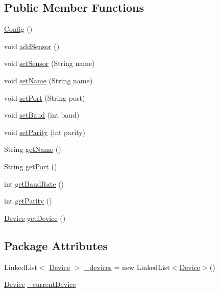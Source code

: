 \subsection*{Public Member Functions}
\begin{DoxyCompactItemize}
\item 
\hyperlink{classrob_o_s2_1_1serial_1_1_config_a80dbd2228453f877f4f5b6ca01280a77}{Config} ()
\item 
void \hyperlink{classrob_o_s2_1_1serial_1_1_config_a36382168c14ad963ea4ea4ebd9ffaf83}{addSensor} ()
\item 
void \hyperlink{classrob_o_s2_1_1serial_1_1_config_a99a7d794a237a4d1cc6cae19e3ffaa7b}{setSensor} (String name)
\item 
void \hyperlink{classrob_o_s2_1_1serial_1_1_config_a1517f09a1d0b9e3250bcfb87a288bf1d}{setName} (String name)
\item 
void \hyperlink{classrob_o_s2_1_1serial_1_1_config_a70c08cb258889e022df827e7533010e5}{setPort} (String port)
\item 
void \hyperlink{classrob_o_s2_1_1serial_1_1_config_accf154afe9e20a80b3117062e1583d9a}{setBaud} (int baud)
\item 
void \hyperlink{classrob_o_s2_1_1serial_1_1_config_a4fc55b5b2dc93aca2204434972343fde}{setParity} (int parity)
\item 
String \hyperlink{classrob_o_s2_1_1serial_1_1_config_a671c77f48aef2048043ff941fd125c07}{getName} ()
\item 
String \hyperlink{classrob_o_s2_1_1serial_1_1_config_a59ca1e514947e8548832249f1794ffc7}{getPort} ()
\item 
int \hyperlink{classrob_o_s2_1_1serial_1_1_config_a97179a6af377270a46ba76b210cef453}{getBaudRate} ()
\item 
int \hyperlink{classrob_o_s2_1_1serial_1_1_config_a2f996644f21d7d1cd9e61de83c69ecd1}{getParity} ()
\item 
\hyperlink{classrob_o_s2_1_1serial_1_1_device}{Device} \hyperlink{classrob_o_s2_1_1serial_1_1_config_a665b43dd80b1b7cdbd7ba1cb7ab7b7f6}{getDevice} ()
\end{DoxyCompactItemize}
\subsection*{Package Attributes}
\begin{DoxyCompactItemize}
\item 
LinkedList$<$ \hyperlink{classrob_o_s2_1_1serial_1_1_device}{Device} $>$ \hyperlink{classrob_o_s2_1_1serial_1_1_config_afafb54da39f788da9548e1bc957a44b6}{\_\-devices} = new LinkedList$<$\hyperlink{classrob_o_s2_1_1serial_1_1_device}{Device}$>$()
\item 
\hyperlink{classrob_o_s2_1_1serial_1_1_device}{Device} \hyperlink{classrob_o_s2_1_1serial_1_1_config_a9973bd83d16badea8a822f7f73a03783}{\_\-currentDevice}
\end{DoxyCompactItemize}


